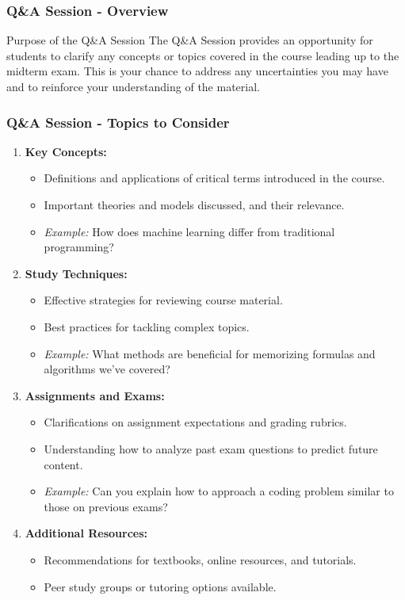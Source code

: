 \documentclass[aspectratio=169]{beamer}
\begin{document}
\begin{frame}[fragile]
  \frametitle{Q\&A Session - Overview}
  \begin{block}{Purpose of the Q\&A Session}
    The Q\&A Session provides an opportunity for students to clarify any concepts or topics covered in the course leading up to the midterm exam. This is your chance to address any uncertainties you may have and to reinforce your understanding of the material.
  \end{block}
\end{frame}

\begin{frame}[fragile]
  \frametitle{Q\&A Session - Topics to Consider}
  \begin{enumerate}
    \item \textbf{Key Concepts:}
      \begin{itemize}
        \item Definitions and applications of critical terms introduced in the course.
        \item Important theories and models discussed, and their relevance.
        \item \emph{Example:} How does machine learning differ from traditional programming?
      \end{itemize}

    \item \textbf{Study Techniques:}
      \begin{itemize}
        \item Effective strategies for reviewing course material.
        \item Best practices for tackling complex topics.
        \item \emph{Example:} What methods are beneficial for memorizing formulas and algorithms we’ve covered?
      \end{itemize}
    
    \item \textbf{Assignments and Exams:}
      \begin{itemize}
        \item Clarifications on assignment expectations and grading rubrics.
        \item Understanding how to analyze past exam questions to predict future content.
        \item \emph{Example:} Can you explain how to approach a coding problem similar to those on previous exams?
      \end{itemize}
    
    \item \textbf{Additional Resources:}
      \begin{itemize}
        \item Recommendations for textbooks, online resources, and tutorials.
        \item Peer study groups or tutoring options available.
      \end{itemize}
  \end{enumerate}
\end{frame}
\end{document}
